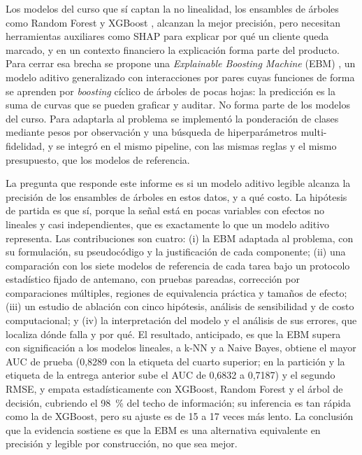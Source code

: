 Los modelos del curso que sí captan la no linealidad, los ensambles de árboles como Random Forest
\citep{breiman2001rf} y XGBoost \citep{chen2016xgboost}, alcanzan la mejor precisión, pero necesitan
herramientas auxiliares como SHAP \citep{lundberg2017shap} para explicar por qué un cliente queda marcado, y en
un contexto financiero la explicación forma parte del producto. Para cerrar esa brecha se propone una
\emph{Explainable Boosting Machine} (EBM) \citep{lou2012intelligible,lou2013ga2m,nori2019interpretml}, un
modelo aditivo generalizado con interacciones por pares cuyas funciones de forma se aprenden por \emph{boosting}
cíclico de árboles de pocas hojas: la predicción es la suma de curvas que se pueden graficar y auditar. No forma
parte de los modelos del curso. Para adaptarla al problema se implementó la ponderación de clases mediante pesos
por observación y una búsqueda de hiperparámetros multi-fidelidad, y se integró en el mismo pipeline, con las
mismas reglas y el mismo presupuesto, que los modelos de referencia.

La pregunta que responde este informe es si un modelo aditivo legible alcanza la precisión de los ensambles de
árboles en estos datos, y a qué costo. La hipótesis de partida es que sí, porque la señal está en pocas
variables con efectos no lineales y casi independientes, que es exactamente lo que un modelo aditivo
representa. Las contribuciones son cuatro: (i) la EBM adaptada al problema, con su formulación, su pseudocódigo
y la justificación de cada componente; (ii) una comparación con los siete modelos de referencia de cada tarea
bajo un protocolo estadístico fijado de antemano, con pruebas pareadas, corrección por comparaciones
múltiples, regiones de equivalencia práctica y tamaños de efecto; (iii) un estudio de ablación con cinco
hipótesis, análisis de sensibilidad y de costo computacional; y (iv) la interpretación del modelo y el análisis
de sus errores, que localiza dónde falla y por qué. El resultado, anticipado, es que la EBM supera con
significación a los modelos lineales, a k-NN y a Naive Bayes, obtiene el mayor AUC de prueba (0,8289 con la
etiqueta del cuarto superior; en la partición y la etiqueta de la entrega anterior sube el AUC de 0,6832 a
0,7187) y el segundo RMSE, y empata estadísticamente con XGBoost, Random Forest y el árbol de decisión,
cubriendo el 98~\% del techo de información; su inferencia es tan rápida como la de XGBoost, pero su ajuste es
de 15 a 17 veces más lento. La conclusión que la evidencia sostiene es que la EBM es una alternativa equivalente
en precisión y legible por construcción, no que sea mejor.


